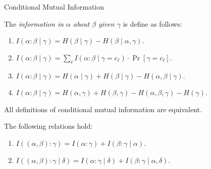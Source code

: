 \documentclass[handout,aspectratio=169]{beamer}
\begin{document}
\begin{frame}{Conditional Mutual Information}
\begin{definition}
    The \emph{information in \(\alpha\) about \(\beta\) given \(\gamma\)} is define as follows:
    \begin{enumerate}
        \item \(I(\alpha:\beta\mid\gamma) = H(\beta\mid\gamma) - H(\beta\mid\alpha,\gamma)\).
        \item \(I(\alpha:\beta\mid\gamma) = \sum_\ell I(\alpha:\beta \mid \gamma = c_\ell) \cdot \Pr[\gamma = c_\ell]\).
        \item \(I(\alpha:\beta\mid\gamma) = H(\alpha\mid\gamma) + H(\beta\mid\gamma) - H(\alpha,\beta\mid\gamma)\).
        \item \(I(\alpha:\beta\mid\gamma) = H(\alpha,\gamma) + H(\beta,\gamma) - H(\alpha,\beta,\gamma) - H(\gamma)\).
    \end{enumerate}
\end{definition}

\begin{lemma}
    All definitions of conditional mutual information are equivalent.
\end{lemma}

\begin{lemma}
    The following relations hold:
    \begin{enumerate}
        \item \(I((\alpha,\beta) : \gamma) = I(\alpha : \gamma) + I(\beta: \gamma \mid \alpha)\).
        \item \(I((\alpha,\beta) : \gamma \mid \delta) = I(\alpha : \gamma \mid \delta) + I(\beta: \gamma \mid \alpha, \delta)\).
    \end{enumerate}
\end{lemma}
\end{frame}
\end{document}
